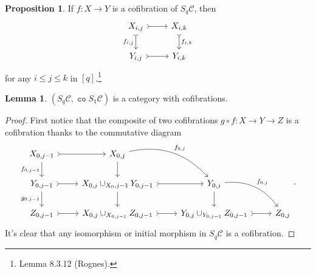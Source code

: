 \documentclass[10pt,letterpaper,cm]{nupset}
\theoremstyle{definition}
\theoremstyle{theorem}
\newtheorem{lemma}[definition]{Lemma}
\newtheorem{prop}[definition]{Proposition}
\theoremstyle{remark}
\newcommand{\1}{\mathbf{1}}
\renewcommand{\c}{\mathscr{C}}
\newcommand{\0}{\vec 0}
\DeclareMathOperator{\co}{\mathtt{co}}
\begin{document}
\begin{prop}
If $f: X \to Y$ is a cofibration of $S_q\c$, then 
\[
\begin{tikzcd}
{X_{i, j}} \arrow[d, "{f_{i,j}}"', tail] \arrow[r, tail] & {X_{i, k}} \arrow[d, "{f_{i,k}}", tail] \\
{Y_{i, j}} \arrow[r, tail] & {Y_{i,k}}
\end{tikzcd}
\] for any $i \leq j \leq k$ in $[q]$.\footnote{Lemma 8.3.12 (Rognes).}
\end{prop}

\begin{lemma}
$\left(S_q\c, \co{S_1} \c\right)$ is a category with cofibrations. 
\end{lemma}
\begin{proof}
First notice that the composite of two cofibrations $g \circ f : X \to Y \to Z$ is a cofibration thanks to the commutative diagram 
\[
\begin{tikzcd}
{X_{0, j-1}} \arrow[r, tail] \arrow[d, "{f_{0, j-1}}"'] & {X_{0, j}} \arrow[d] \arrow[rd, "{f_{0, j}}", bend left] &  &  \\
{Y_{0, j-1}} \arrow[d, "{g_{0, j-1}}"'] \arrow[r, tail] & {X_{0, j} \cup_{X_0, j-1} Y_{0, j-1}} \arrow[d] \arrow[r, tail] & {Y_{0, j}} \arrow[d] \arrow[rd, "{f_{0, j}}", bend left] &  \\
{Z_{0, j-1}} \arrow[r, tail] & {X_{0, j} \cup_{X_{0, j-1}} Z_{0, j-1}} \arrow[r, tail] & {Y_{0, j} \cup_{Y_{0, j-1}} Z_{0, j-1}} \arrow[r, tail] & {Z_{0, j}}
\end{tikzcd}.
\]
It's clear that any isomorphism or initial morphism in $S_q \c$ is a cofibration.



\end{proof}
\end{document}

